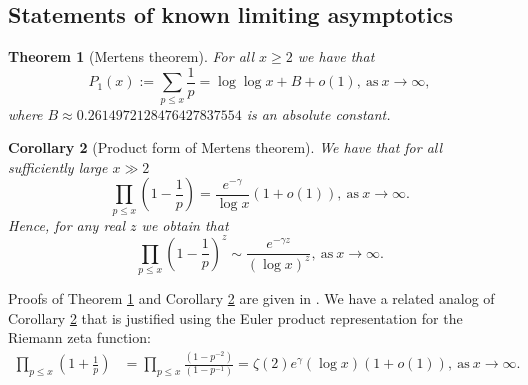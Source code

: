 \documentclass[11pt,reqno,a4letter]{article}
\numberwithin{figure}{section}
\numberwithin{table}{section}
\theoremstyle{plain}
\newtheorem{theorem}{Theorem}
\newtheorem{cor}[theorem]{Corollary}
\numberwithin{theorem}{section}
\theoremstyle{definition}
\begin{document}
\subsection{Statements of known limiting asymptotics} 
\label{subSection_OtherFactsAndResults} 

\begin{theorem}[Mertens theorem]
\label{theorem_Mertens_theorem} 
For all $x \geq 2$ we have that 
\[
P_1(x) := \sum_{p \leq x} \frac{1}{p} = \log\log x + B + o(1), 
     \mathrm{\ as\ } x \rightarrow \infty, 
\]
where 
$B \approx 0.2614972128476427837554$ 
is an absolute constant.
\end{theorem} 

\begin{cor}[Product form of Mertens theorem] 
\label{lemma_Gz_productTermV2} 
We have that for all sufficiently large $x \gg 2$ 
\[
\prod_{p \leq x} \left(1 - \frac{1}{p}\right) = \frac{e^{-\gamma}}{\log x}\left( 
     1 + o(1)\right), \mathrm{\ as\ } x \rightarrow \infty. 
\]
Hence, for any real $z$ we obtain that 
\[
\prod_{p \leq x} \left(1 - \frac{1}{p}\right)^{z} \sim 
     \frac{e^{-\gamma z}}{(\log x)^{z}}, \mathrm{\ as\ } x \rightarrow \infty. 
\]
\end{cor} 

Proofs of Theorem \ref{theorem_Mertens_theorem} and 
Corollary \ref{lemma_Gz_productTermV2} are given in 
\cite[\S 22.7; \S 22.8]{HARDYWRIGHT}. 
We have a related analog of Corollary \ref{lemma_Gz_productTermV2} 
that is justified using the Euler product representation for the 
Riemann zeta function: 
\begin{align*} 
\prod_{p \leq x} \left(1 + \frac{1}{p}\right) & = \prod_{p \leq x} 
     \frac{\left(1 - p^{-2}\right)}{\left(1 - p^{-1}\right)} 
     = \zeta(2) e^{\gamma} (\log x) (1 + o(1)), 
     \mathrm{\ as\ } x \rightarrow \infty. 
\end{align*} 
\end{document}
